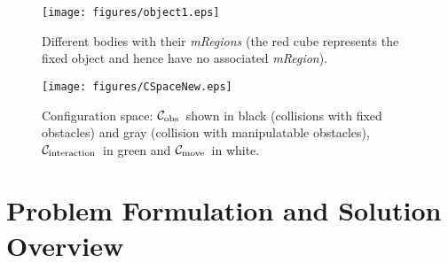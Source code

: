 \documentclass[twocolumn]{svjour3}          %
\newcommand {\Cobstacle}{\hbox{{$\cal C_{\textrm{obs}}$}}}                %
\newcommand {\Cint}{\hbox{{$\cal C_{\textrm{interaction}}$}}}                %
\newcommand {\Cmove}{\hbox{{$\cal C_{\textrm{move}}$}}}                %
\begin{document}
\begin{figure}[t]
\begin{center}
   \texttt{[image: figures/object1.eps]}
   \caption{Different bodies with their \textit{mRegions} (the red cube represents the fixed object and hence have no associated \textit{mRegion}).} \label{fig:objects}
\end{center}
\end{figure}
\begin{figure}[t]
\begin{center}
   \texttt{[image: figures/CSpaceNew.eps]}
   \caption {Configuration space: \Cobstacle\ shown in black (collisions with fixed obstacles) and gray (collision with manipulatable obstacles), \Cint\ in green and \Cmove\ in white.}\label{cspace}
\end{center}
\end{figure}
\section{Problem Formulation and Solution Overview}\label{s-overview}
\end{document}
